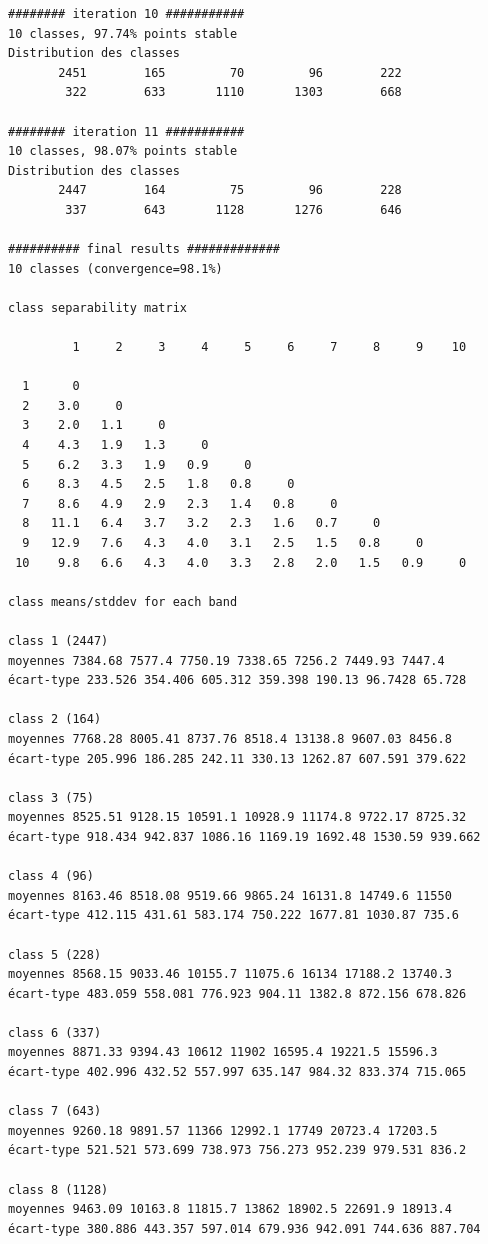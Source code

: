 \documentclass[earth,article,submit,pdftex,moreauthors]{Definitions/mdpi}
\begin{document}
{\begin{scriptsize}
\begin{verbatim}
######## iteration 10 ###########
10 classes, 97.74% points stable
Distribution des classes
       2451        165         70         96        222
        322        633       1110       1303        668

######## iteration 11 ###########
10 classes, 98.07% points stable
Distribution des classes
       2447        164         75         96        228
        337        643       1128       1276        646

########## final results #############
10 classes (convergence=98.1%)

class separability matrix

         1     2     3     4     5     6     7     8     9    10

  1      0
  2    3.0     0
  3    2.0   1.1     0
  4    4.3   1.9   1.3     0
  5    6.2   3.3   1.9   0.9     0
  6    8.3   4.5   2.5   1.8   0.8     0
  7    8.6   4.9   2.9   2.3   1.4   0.8     0
  8   11.1   6.4   3.7   3.2   2.3   1.6   0.7     0
  9   12.9   7.6   4.3   4.0   3.1   2.5   1.5   0.8     0
 10    9.8   6.6   4.3   4.0   3.3   2.8   2.0   1.5   0.9     0

class means/stddev for each band

class 1 (2447)
moyennes 7384.68 7577.4 7750.19 7338.65 7256.2 7449.93 7447.4
écart-type 233.526 354.406 605.312 359.398 190.13 96.7428 65.728

class 2 (164)
moyennes 7768.28 8005.41 8737.76 8518.4 13138.8 9607.03 8456.8
écart-type 205.996 186.285 242.11 330.13 1262.87 607.591 379.622

class 3 (75)
moyennes 8525.51 9128.15 10591.1 10928.9 11174.8 9722.17 8725.32
écart-type 918.434 942.837 1086.16 1169.19 1692.48 1530.59 939.662

class 4 (96)
moyennes 8163.46 8518.08 9519.66 9865.24 16131.8 14749.6 11550
écart-type 412.115 431.61 583.174 750.222 1677.81 1030.87 735.6

class 5 (228)
moyennes 8568.15 9033.46 10155.7 11075.6 16134 17188.2 13740.3
écart-type 483.059 558.081 776.923 904.11 1382.8 872.156 678.826

class 6 (337)
moyennes 8871.33 9394.43 10612 11902 16595.4 19221.5 15596.3
écart-type 402.996 432.52 557.997 635.147 984.32 833.374 715.065

class 7 (643)
moyennes 9260.18 9891.57 11366 12992.1 17749 20723.4 17203.5
écart-type 521.521 573.699 738.973 756.273 952.239 979.531 836.2

class 8 (1128)
moyennes 9463.09 10163.8 11815.7 13862 18902.5 22691.9 18913.4
écart-type 380.886 443.357 597.014 679.936 942.091 744.636 887.704


\end{verbatim}
\end{scriptsize}}
\end{document}
